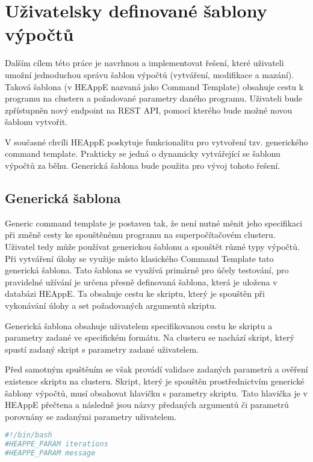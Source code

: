 \chapter{Uživatelsky definované šablony výpočtů}
Dalším cílem této práce je navrhnou a implementovat řešení, které uživateli umožní jednoduchou správu šablon výpočtů (vytváření, modifikace a mazání). Taková šablona (v HEAppE nazvaná jako Command Template) obsahuje cestu k programu na clusteru a požadované parametry daného programu. Uživateli bude zpřístupněn nový endpoint na REST API, pomocí kterého bude možné novou šablonu vytvořit.

V současné chvíli HEAppE poskytuje funkcionalitu pro vytvoření tzv. generického command template. Prakticky se jedná o dynamicky vytvářející se šablonu výpočtů za běhu. Generická šablona bude použita pro vývoj tohoto řešení.

\section{Generická šablona}
Generic command template je postaven tak, že není nutné měnit jeho specifikaci při změně cesty ke spouštěnému programu na superpočítačovém clusteru. Uživatel tedy může používat generickou šablonu a spouštět různé typy výpočtů. Při vytváření úlohy se využije místo klasického Command Template tato generická šablona. Tato šablona se využívá primárně pro účely testování, pro pravidelné užívání je určena přesně definovaná šablona, která je uložena v databázi HEAppE. Ta obsahuje cestu ke skriptu, který je spouštěn při vykonávání úlohy a set požadovaných argumentů skriptu.

Generická šablona obsahuje uživatelem specifikovanou cestu ke skriptu a parametry zadané ve specifickém formátu. Na clusteru se nachází skript, který spustí zadaný skript s parametry zadané uživatelem.

Před samotným spuštěním se však provádí validace zadaných parametrů a ověření existence skriptu na clusteru. Skript, který je spouštěn prostřednictvím generické šablony výpočtů, musí obsahovat hlavičku s parametry skriptu. Tato hlavička je v HEAppE přečtena a následně jsou názvy předaných argumentů či parametrů porovnány se zadanými parametry uživatelem.

\newpage
\begin{lstlisting}[language=bash,caption={Ukázková hlavička skriptu s „generickými“ parametry iterations a message}]
#!/bin/bash
#HEAPPE_PARAM iterations
#HEAPPE_PARAM message
\end{lstlisting}

